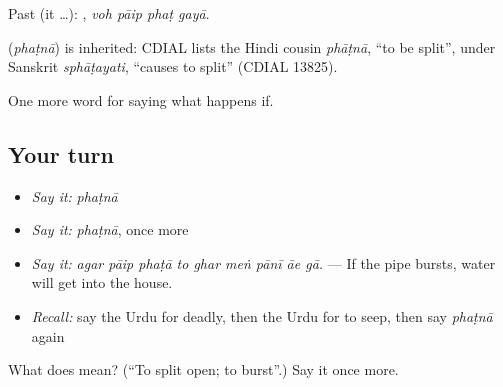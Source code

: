 Past (it …):    , \emph{voh pāip phaṭ gayā}.

\begin{cousinweb}
\textbf{} (\emph{phaṭnā}) is inherited: CDIAL lists the Hindi cousin \emph{phāṭnā}, \textquotedblleft{}to be split\textquotedblright{}, under Sanskrit \emph{sphāṭayati}, \textquotedblleft{}causes to split\textquotedblright{} (CDIAL 13825).
\end{cousinweb}

\begin{grammarlens}[title={What you've built}]
One more word for saying what happens if.
\end{grammarlens}

\subsection*{Your turn}
\begin{itemize}
\raggedright
  \item \emph{Say it:} \emph{phaṭnā}
  \item \emph{Say it:} \emph{phaṭnā}, once more
  \item \emph{Say it:} \emph{agar pāip phaṭā to ghar meṅ pānī āe gā.} — If the pipe bursts, water will get into the house.
  \item \emph{Recall:} say the Urdu for deadly, then the Urdu for to seep, then say \emph{phaṭnā} again
\end{itemize}

\begin{tcolorbox}[breakable,colback=teal!4,colframe=teal!35!black,title={Before you move on}]
What does  mean? (\textquotedblleft{}To split open; to burst\textquotedblright{}.) Say it once more.
\end{tcolorbox}
